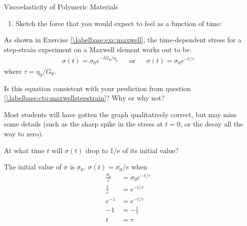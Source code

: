 \begin{activity}{Viscoelasticity of Polymeric Materials}
\begin{ctqs}
\begin{enumerate}
			\item Sketch the force that you would expect to feel as a function of time: \label{\labelbase:ctq:maxwellstepstrain}
			
				\begin{solution}[1.75in]
				\end{solution}
		\end{enumerate}
					
\end{ctqs}

\begin{infobox}
	As shown in Exercise \ref{\labelbase:exc:maxwell}, the time-dependent stress for a step-strain experiment on a Maxwell element works out to be:
	\begin{align*}
		\sigma(t) = \sigma_0 e^{-t G_0/\eta_0}  && \text{or} && \sigma(t) = \sigma_0 e^{-t /\tau}
	\end{align*}
	where $\tau = \eta_0/G_0$.
\end{infobox}

\begin{ctqs}
	
	\question Is this equation consistent with your prediction from question \ref{\labelbase:ctq:maxwellstepstrain}?  Why or why not?
	
					\begin{solution}[1.75in]
					
						Most students will have gotten the graph qualitatively correct, but may miss some details (such as the sharp spike in the stress at $t=0$, or the decay all the way to zero).
					
					\end{solution}
		
	\question At what time $t$ will $\sigma(t)$ drop to 1/e of its initial value?
	
					\begin{solution}[1.75in]
						The initial value of $\sigma$ is $\sigma_0$.  $\sigma(t) = \sigma_0/e$ when
						\begin{align*}
							\frac{\sigma_0}{e} &= \sigma_0 e^{-t/\tau} \\
							\frac{1}{e} &= e^{-t/\tau}\\
							e^{-1} &= e^{-t/\tau}\\
							-1 &= -\frac{t}{\tau} \\
							t &= \tau
						\end{align*}
					\end{solution}
		

\end{ctqs}
\end{activity}
